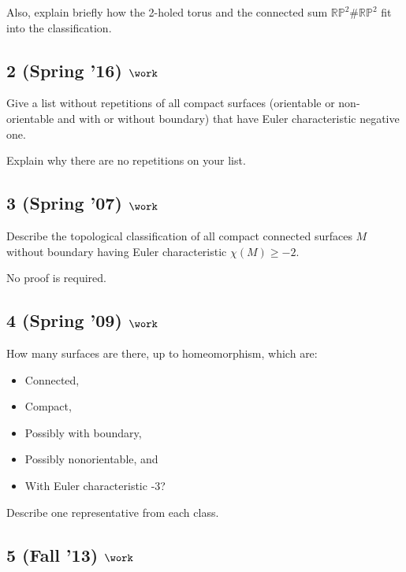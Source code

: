 Also, explain briefly how the 2-holed torus and the connected sum
\({\mathbb{RP}}^2 \# {\mathbb{RP}}^2\) fit into the classification.

\hypertarget{spring-16-work-2}{%
\subsection{\texorpdfstring{2 (Spring '16)
\(\work\)}{2 (Spring '16) \textbackslash work}}\label{spring-16-work-2}}

Give a list without repetitions of all compact surfaces (orientable or
non-orientable and with or without boundary) that have Euler
characteristic negative one.

Explain why there are no repetitions on your list.

\hypertarget{spring-07-work-3}{%
\subsection{\texorpdfstring{3 (Spring '07)
\(\work\)}{3 (Spring '07) \textbackslash work}}\label{spring-07-work-3}}

Describe the topological classification of all compact connected
surfaces \(M\) without boundary having Euler characteristic
\(\chi(M )\geq -2\).

No proof is required.

\hypertarget{spring-09-work-6}{%
\subsection{\texorpdfstring{4 (Spring '09)
\(\work\)}{4 (Spring '09) \textbackslash work}}\label{spring-09-work-6}}

How many surfaces are there, up to homeomorphism, which are:

\begin{itemize}
\tightlist
\item
  Connected,
\item
  Compact,
\item
  Possibly with boundary,
\item
  Possibly nonorientable, and
\item
  With Euler characteristic -3?
\end{itemize}

Describe one representative from each class.

\hypertarget{fall-13-work}{%
\subsection{\texorpdfstring{5 (Fall '13)
\(\work\)}{5 (Fall '13) \textbackslash work}}\label{fall-13-work}}

